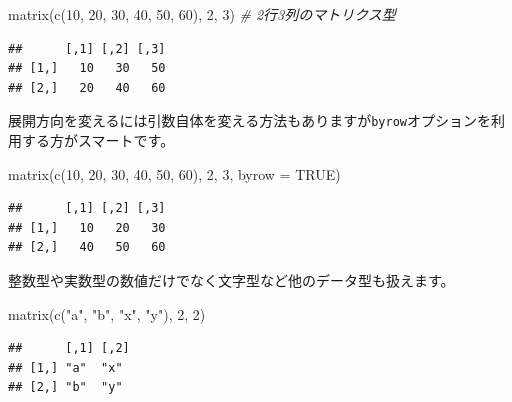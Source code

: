 \documentclass[
  12pt,
]{book}
\newenvironment{Shaded}{\begin{snugshade}}{\end{snugshade}}
\newcommand{\AttributeTok}[1]{\textcolor[rgb]{0.77,0.63,0.00}{#1}}
\newcommand{\CommentTok}[1]{\textcolor[rgb]{0.56,0.35,0.01}{\textit{#1}}}
\newcommand{\ConstantTok}[1]{\textcolor[rgb]{0.00,0.00,0.00}{#1}}
\newcommand{\DecValTok}[1]{\textcolor[rgb]{0.00,0.00,0.81}{#1}}
\newcommand{\FunctionTok}[1]{\textcolor[rgb]{0.00,0.00,0.00}{#1}}
\newcommand{\NormalTok}[1]{#1}
\newcommand{\StringTok}[1]{\textcolor[rgb]{0.31,0.60,0.02}{#1}}
\begin{document}
\begin{Shaded}
\begin{Highlighting}[numbers=left,,]
\FunctionTok{matrix}\NormalTok{(}\FunctionTok{c}\NormalTok{(}\DecValTok{10}\NormalTok{, }\DecValTok{20}\NormalTok{, }\DecValTok{30}\NormalTok{, }\DecValTok{40}\NormalTok{, }\DecValTok{50}\NormalTok{, }\DecValTok{60}\NormalTok{), }\DecValTok{2}\NormalTok{, }\DecValTok{3}\NormalTok{)     }\CommentTok{\# 2行3列のマトリクス型}
\end{Highlighting}
\end{Shaded}

\begin{verbatim}
##      [,1] [,2] [,3]
## [1,]   10   30   50
## [2,]   20   40   60
\end{verbatim}

展開方向を変えるには引数自体を変える方法もありますが\texttt{byrow}オプションを利用する方がスマートです。

\begin{Shaded}
\begin{Highlighting}[numbers=left,,]
\FunctionTok{matrix}\NormalTok{(}\FunctionTok{c}\NormalTok{(}\DecValTok{10}\NormalTok{, }\DecValTok{20}\NormalTok{, }\DecValTok{30}\NormalTok{, }\DecValTok{40}\NormalTok{, }\DecValTok{50}\NormalTok{, }\DecValTok{60}\NormalTok{), }\DecValTok{2}\NormalTok{, }\DecValTok{3}\NormalTok{, }\AttributeTok{byrow =} \ConstantTok{TRUE}\NormalTok{)}
\end{Highlighting}
\end{Shaded}

\begin{verbatim}
##      [,1] [,2] [,3]
## [1,]   10   20   30
## [2,]   40   50   60
\end{verbatim}

整数型や実数型の数値だけでなく文字型など他のデータ型も扱えます。

\begin{Shaded}
\begin{Highlighting}[numbers=left,,]
\FunctionTok{matrix}\NormalTok{(}\FunctionTok{c}\NormalTok{(}\StringTok{"a"}\NormalTok{, }\StringTok{"b"}\NormalTok{, }\StringTok{"x"}\NormalTok{, }\StringTok{"y"}\NormalTok{), }\DecValTok{2}\NormalTok{, }\DecValTok{2}\NormalTok{)}
\end{Highlighting}
\end{Shaded}

\begin{verbatim}
##      [,1] [,2]
## [1,] "a"  "x" 
## [2,] "b"  "y"
\end{verbatim}
\end{document}
